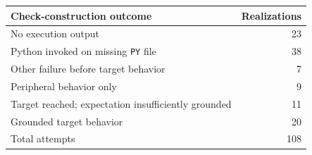 \begin{tabular}{lr}
\toprule
Check-construction outcome & Realizations \\
\midrule
No execution output & 23 \\
Python invoked on missing \texttt{PY} file & 38 \\
Other failure before target behavior & 7 \\
Peripheral behavior only & 9 \\
Target reached; expectation insufficiently grounded & 11 \\
Grounded target behavior & 20 \\
\midrule
Total attempts & 108 \\
\bottomrule
\end{tabular}
